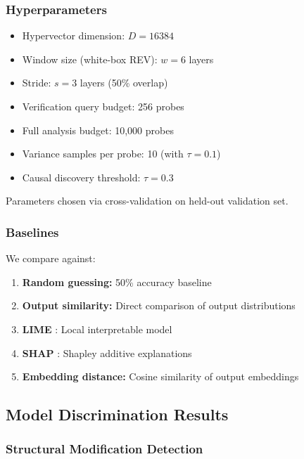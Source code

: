 \documentclass[11pt,a4paper]{article}
\begin{document}
\subsubsection{Hyperparameters}

\begin{itemize}
\item Hypervector dimension: $D = 16384$
\item Window size (white-box REV): $w = 6$ layers
\item Stride: $s = 3$ layers (50\% overlap)
\item Verification query budget: 256 probes
\item Full analysis budget: 10,000 probes
\item Variance samples per probe: 10 (with $\tau = 0.1$)
\item Causal discovery threshold: $\tau = 0.3$
\end{itemize}

Parameters chosen via cross-validation on held-out validation set.

\subsubsection{Baselines}

We compare against:
\begin{enumerate}
\item \textbf{Random guessing:} 50\% accuracy baseline
\item \textbf{Output similarity:} Direct comparison of output distributions
\item \textbf{LIME} \citep{ribeiro2016should}: Local interpretable model
\item \textbf{SHAP} \citep{lundberg2017unified}: Shapley additive explanations
\item \textbf{Embedding distance:} Cosine similarity of output embeddings
\end{enumerate}

\subsection{Model Discrimination Results}

\subsubsection{Structural Modification Detection}
\end{document}
